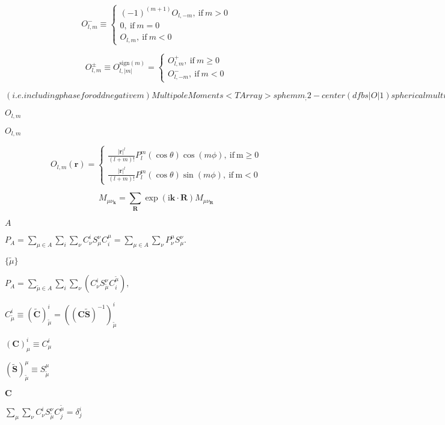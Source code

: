 \documentclass{article}
\begin{document}
\[ O^-_{l,m} \equiv \begin{cases} (-1)^{(m+1)} O_{l,-m} \mathrm{,\ if\ } m > 0 \\ 0 \mathrm{,\ if\ } m = 0 \\ O_{l, m} \mathrm{,\ if\ } m < 0 \end{cases} \]
\pagebreak

\[ O^\pm_{l,m} \equiv O^{\mathrm{sign}(m)}_{l, |m|} = \begin{cases} O^+_{l,m} \mathrm{,\ if\ } m \geq 0 \\ O^-_{l,-m} \mathrm{,\ if\ } m < 0 \end{cases} \]
\pagebreak

$ (i.e. including phase for odd negative m) MultipoleMoments<TArray> sphemm_; 2-center (dfbs|O|1) spherical multipole integrals, \$ O^\pm_{l,m} $
\pagebreak

$ O_{l,m} $
\pagebreak

$ O_{l, m} $
\pagebreak

\[ O_{l,m}(\mathbf{r}) = \begin{cases} \frac{|\mathbf{r}|^{l}}{(l+m)!} P_l^m(\cos\theta) \cos(m \phi), \mathrm{\ if\ m \geq 0} \\ \frac{|\mathbf{r}|^{l}}{(l+m)!} P_l^m(\cos\theta) \sin(m \phi), \mathrm{\ if\ m < 0} \end{cases} \]
\pagebreak

\[ M_{\mu \nu_{\mathbf{k}}} = \sum_{\mathbf{R}} \exp( \mathrm{i} \mathbf{k}\cdot\mathbf{R} ) M_{\mu \nu_{\mathbf{R}}} \]
\pagebreak

$ A $
\pagebreak

$ P_A = \sum_{\mu \in A} \sum_i \sum_\nu C^i_\nu S^{\nu}_{\mu} C^\mu_i = \sum_{\mu \in A} \sum_\nu P^\mu_\nu S^{\nu}_{\mu} . $
\pagebreak

$ \{ \tilde{\mu} \} $
\pagebreak

$ P_A = \sum_{\tilde{\mu} \in A} \sum_i \sum_\nu \left( C^i_{\nu} S^{\nu}_{\tilde{\mu}} C^{\tilde{\mu}}_i \right), $
\pagebreak

$ C_{\tilde{\mu}}^i \equiv \left(\mathbf{\tilde{C}}\right)_{\tilde{\mu}}^i = \left(\left(\mathbf{C} \mathbf{\tilde{S}}\right)^{-1}\right)_{\tilde{\mu}}^i $
\pagebreak

$ \left(\mathbf{C}\right)^i_\mu \equiv C^i_\mu $
\pagebreak

$ \left(\mathbf{\tilde{S}}\right)^\mu_{\tilde{\mu}} \equiv S^\mu_{\tilde{\mu}} $
\pagebreak

$ \mathbf{C} $
\pagebreak

$ \sum_{\mu} \sum_\nu C^i_{\nu} S^{\nu}_{\tilde{\mu}} C^{\tilde{\mu}}_j = \delta^i_j $
\pagebreak
\end{document}

